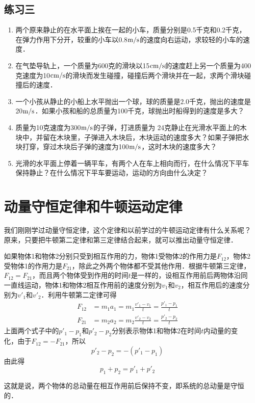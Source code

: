 \subsection*{练习三}
\begin{enumerate}
    \item 两个原来静止的在水平面上挨在一起的小车，质量分别是0.5千克和0.2千克，在弹力作用下分开，较重的小车以0.8$\text{m}/\text{s}$的速度向右运动，求较轻的小车的速度．
    \item 在气垫导轨上，一个质量为600克的滑块以15${\rm cm}/{\rm s}$的速度赶上另一个质量为400克速度为10${\rm cm}/{\rm s}$的滑块而发生碰撞，碰撞后两个滑块并在一起，求两个滑块碰撞后的速度．
    \item 一个小孩从静止的小船上水平抛出一个球，球的质量是2.0千克，抛出的速度是20$\text{m}/\text{s}$．如果小孩和船的总质量为100千克，球抛出时船得到的速度是多大？
    \item 质量为10克速度为300$\text{m}/\text{s}$的子弹，打进质量为
    24克静止在光滑水平面上的木块中，并留在木块里，子弹进入木块后，木块运动的速度多大？如果子弹把水块打穿，穿过木块后子弹的速度为100$\text{m}/\text{s}$，这时木块的速度多大？
    \item 光滑的水平面上停着一辆平车，有两个人在车上相向而行，在什么情况下平车保持静止？在什么情况下平车要运动，运动的方向由什么决定？
\end{enumerate}

\section{动量守恒定律和牛顿运动定律}
我们刚刚学过动量守恒定律，这个定律和以前学过的牛顿运动定律有什么关系呢？原来，只要把牛顿第二定律和第三定律结合起来，就可以推出动量守恒定律．

如果物体1和物体2分别只受到相互作用的力，物体1受物体2的作用力是$F_{12}$，物体2受物体1的作用力是$F_{21}$，除此之外两个物体都不受其他作用．根据牛顿第三定律，$F_{12}=F_{21}$，而且两个物体受到作用的时间$t$是一样的，设相互作用前后两物体沿同一直线运动，物体1和物体2相互作用前的速度分别为$v_1$和$v_2$，相互作用后的速度分别为$v'_1$和$v'_2$．利用牛顿第二定律可得
\[\begin{split}
    F_{12}&=m_1a_1=m_1\frac{v'_1-v_1}{t}=\frac{p'_1-p_1}{t}\\
F_{21}&=m_2a_2=m_2\frac{v'_2-v_2}{t}=\frac{p'_2-p_2}{t}
\end{split}\]
上面两个式子中的$p'_1-p_1$和$p'_2-p_2$分别表示物体1和物体2在时间$t$内动量的变化，由于$F_{12}=-F_{21}$，所以
\[p'_2-p_2=- (p'_1-p_1)\]
由此得
\[p_1+p_2=p'_1+p'_2\]

这就是说，两个物体的总动量在相互作用前后保持不变，即系统的总动量是守恒的．

